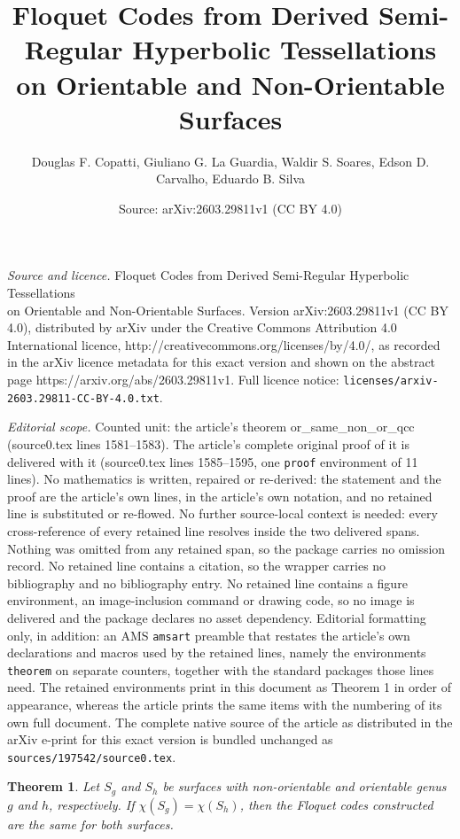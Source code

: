 \documentclass[10pt,a4paper]{amsart}
\title{Floquet Codes from Derived Semi-Regular Hyperbolic Tessellations \\ on Orientable and Non-Orientable Surfaces}
\author{Douglas F. Copatti, Giuliano G. La Guardia, Waldir S. Soares, Edson D. Carvalho, Eduardo B. Silva}
\date{Source: arXiv:2603.29811v1 (CC BY 4.0)}
\newtheorem{theorem}{Theorem}
\begin{document}
\maketitle

\noindent\emph{Source and licence.} Floquet Codes from Derived Semi-Regular Hyperbolic Tessellations \\ on Orientable and Non-Orientable Surfaces. Version arXiv:2603.29811v1 (CC BY 4.0), distributed by arXiv under the Creative Commons Attribution 4.0 International licence, http://creativecommons.org/licenses/by/4.0/, as recorded in the arXiv licence metadata for this exact version and shown on the abstract page https://arxiv.org/abs/2603.29811v1. Full licence notice: \texttt{licenses/arxiv-2603.29811-CC-BY-4.0.txt}.\par\smallskip

\noindent\textit{Editorial scope.} Counted unit: the article's theorem or\_same\_non\_or\_qcc (source0.tex lines 1581--1583). The article's complete original proof of it is delivered with it (source0.tex lines 1585--1595, one \texttt{proof} environment of 11 lines). No mathematics is written, repaired or re-derived: the statement and the proof are the article's own lines, in the article's own notation, and no retained line is substituted or re-flowed.  No further source-local context is needed: every cross-reference of every retained line resolves inside the two delivered spans.  Nothing was omitted from any retained span, so the package carries no omission record.  No retained line contains a citation, so the wrapper carries no bibliography and no bibliography entry.  No retained line contains a figure environment, an image-inclusion command or drawing code, so no image is delivered and the package declares no asset dependency.  Editorial formatting only, in addition: an AMS \texttt{amsart} preamble that restates the article's own declarations and macros used by the retained lines, namely the environments \texttt{theorem} on separate counters, together with the standard packages those lines need.  The retained environments print in this document as Theorem 1 in order of appearance, whereas the article prints the same items with the numbering of its own full document.  The complete native source of the article as distributed in the arXiv e-print for this exact version is bundled unchanged as \texttt{sources/197542/source0.tex}.
\begin{theorem}\label{or_same_non_or_qcc}
	Let $S_{g}$ and $S_{h}$ be surfaces with non-orientable and orientable genus $g$ and $ h $, respectively. If $\chi(S_{g}) = \chi(S_{h})$, then the Floquet codes constructed are the same for both surfaces. 
\end{theorem}
\end{document}
